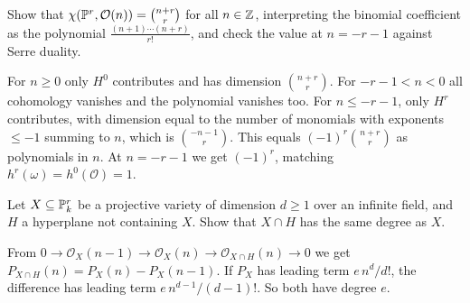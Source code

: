 \begin{exercise}\label{coherent-cohomology:exercise-euler-projective}
Show that $\chi(\mathbb{P}^r, \mathcal{O}(n)) = \binom{n+r}{r}$ for all $n \in \mathbb{Z}$, interpreting the binomial coefficient as the polynomial $\frac{(n+1)\cdots(n+r)}{r!}$, and check the
value at $n = -r-1$ against Serre duality.
\end{exercise}

\begin{solution}
For $n \geq 0$ only $H^0$ contributes and has dimension $\binom{n+r}{r}$. For $-r-1 < n < 0$ all cohomology vanishes and the polynomial vanishes too. For $n \leq -r-1$, only $H^r$
contributes, with dimension equal to the number of monomials with exponents $\leq -1$ summing to $n$, which is $\binom{-n-1}{r}$. This equals $(-1)^r\binom{n+r}{r}$
as polynomials in $n$. At $n = -r-1$ we get $(-1)^r$, matching $h^r(\omega) = h^0(\mathcal{O}) = 1$.
\end{solution}

\begin{exercise}\label{coherent-cohomology:exercise-degree-hyperplane}
Let $X \subseteq \mathbb{P}^r_k$ be a projective variety of dimension $d \geq 1$ over an infinite field, and $H$ a hyperplane not containing $X$. Show that $X \cap H$ has the same
degree as $X$.
\end{exercise}

\begin{solution}
From $0 \to \mathcal{O}_X(n - 1) \to \mathcal{O}_X(n) \to \mathcal{O}_{X \cap H}(n) \to 0$ we get $P_{X \cap H}(n) = P_X(n) - P_X(n-1)$. If $P_X$ has leading term $e\,n^d/d!$, the
difference has leading term $e\,n^{d-1}/(d-1)!$. So both have degree $e$.
\end{solution}
